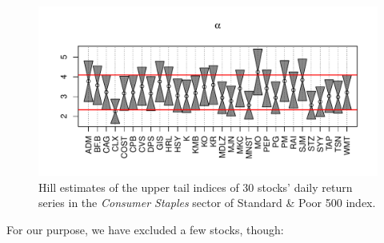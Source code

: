 \documentclass{article}
\begin{document}
\begin{figure}[htb!]
  \centering
  \includegraphics[width=\textwidth]{Consumer_Staples_Hill_upper.pdf}
  \caption{Hill estimates of the upper tail indices of 30 stocks'
    daily return series in the {\it Consumer Staples} sector of
    Standard \& Poor 500 index.
  }
  \label{fig:Consumer_Staples_Hill_upper}
\end{figure}
For our purpose, we have excluded a few stocks, though:
\end{document}
